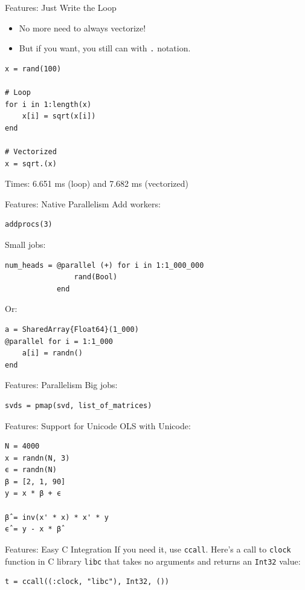 \documentclass[11pt]{beamer}
\begin{document}
\begin{frame}[fragile]{Features: Just Write the Loop}
\begin{itemize}
    \item No more need to always vectorize!
    \item But if you want, you still can with \texttt{.} notation.
\end{itemize}
\begin{verbatim}
x = rand(100)

# Loop
for i in 1:length(x)
    x[i] = sqrt(x[i])
end

# Vectorized
x = sqrt.(x)
\end{verbatim}
Times: 6.651 ms (loop) and 7.682 ms (vectorized)
\end{frame}

\begin{frame}[fragile]{Features: Native Parallelism}
Add workers:
\begin{verbatim}
addprocs(3)
\end{verbatim}
Small jobs:
\begin{verbatim}
num_heads = @parallel (+) for i in 1:1_000_000
                rand(Bool)
            end
\end{verbatim}
Or:
\begin{verbatim}
a = SharedArray{Float64}(1_000)
@parallel for i = 1:1_000
    a[i] = randn()
end
\end{verbatim}
\end{frame}


\begin{frame}[fragile]{Features: Parallelism}
Big jobs:
\begin{verbatim}
svds = pmap(svd, list_of_matrices)
\end{verbatim}
\end{frame}

\begin{frame}[fragile]{Features: Support for Unicode}
OLS with Unicode:
\begin{verbatim}
N = 4000
x = randn(N, 3)
ϵ = randn(N)
β = [2, 1, 90]
y = x * β + ϵ

β̂ = inv(x' * x) * x' * y
ϵ̂ = y - x * β̂
\end{verbatim}
\end{frame}



\begin{frame}[fragile]{Features: Easy C Integration}
If you need it, use \texttt{ccall}.
\pause
Here's a call to \texttt{clock} function in C library \texttt{libc} that takes no arguments and returns an \texttt{Int32} value:
\begin{verbatim}
t = ccall((:clock, "libc"), Int32, ())
\end{verbatim}
\end{frame}
\end{document}
